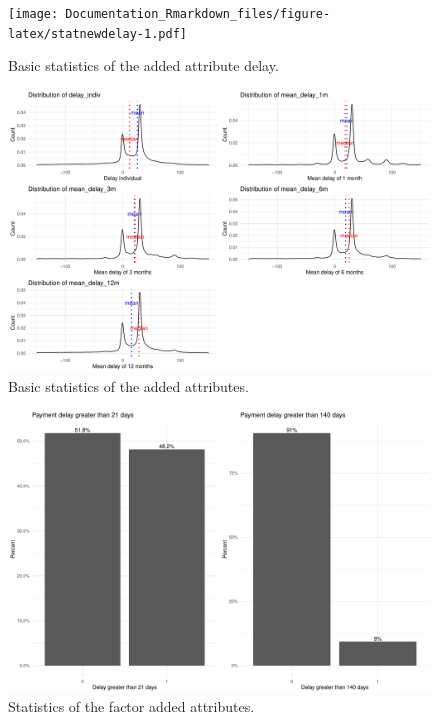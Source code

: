 \documentclass[
]{article}
\begin{document}
\begin{figure}
\centering
\texttt{[image: Documentation\_Rmarkdown\_files/figure-latex/statnewdelay-1.pdf]}
\caption{\label{fig:statnewdelay}\label{fig:stat-newdelay}Basic statistics of the added attribute delay.}
\end{figure}

\begin{figure}
\centering
\includegraphics{Documentation_Rmarkdown_files/figure-latex/statnew-1.pdf}
\caption{\label{fig:statnew}\label{fig:stat-new}Basic statistics of the added attributes.}
\end{figure}

\begin{figure}
\includegraphics[height=0.4\textheight]{Documentation_Rmarkdown_files/figure-latex/helpnew-1} \caption{\label{fig:help_new} Statistics of the factor added attributes.}\label{fig:helpnew}
\end{figure}
\end{document}
